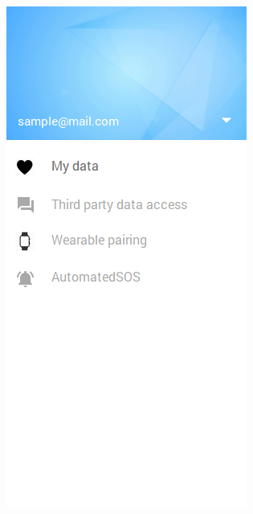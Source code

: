 \begin{figure}[H]
\begin{minipage}{.5\textwidth}
  \includegraphics[width=0.89\linewidth]{resources/Screen/menuindividual.png}
  \label{fig:App Side menu}
\end{minipage}
\end{figure}


